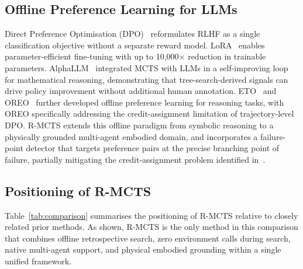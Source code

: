 \documentclass[pdflatex,sn-mathphys-num]{sn-jnl}
\theoremstyle{thmstyleone}
\theoremstyle{thmstyletwo}
\theoremstyle{thmstylethree}
\newcommand{\RMCTS}{\textsc{R-MCTS}}
\begin{document}
\subsection{Offline Preference Learning for LLMs}

Direct Preference Optimisation (DPO)~\cite{rafailov2023direct}
reformulates RLHF as a single classification objective without a
separate reward model.
LoRA~\cite{hu2022lora} enables parameter-efficient fine-tuning with up
to 10,000$\times$ reduction in trainable parameters.
AlphaLLM~\cite{ye2024alphallm} integrated MCTS with LLMs in a
self-improving loop for mathematical reasoning, demonstrating that
tree-search-derived signals can drive policy improvement without
additional human annotation.
ETO~\cite{song2024trial} and OREO~\cite{qu2025oreo} further developed
offline preference learning for reasoning tasks, with OREO specifically
addressing the credit-assignment limitation of trajectory-level DPO.
\RMCTS{} extends this offline paradigm from symbolic reasoning to a
physically grounded multi-agent embodied domain, and incorporates a
failure-point detector that targets preference pairs at the precise
branching point of failure, partially mitigating the credit-assignment
problem identified in~\cite{qu2025oreo}.

\subsection{Positioning of \RMCTS{}}

Table~\ref{tab:comparison} summarises the positioning of \RMCTS{}
relative to closely related prior methods.
As shown, \RMCTS{} is the only method in this comparison that combines
offline retrospective search, zero environment calls during search,
native multi-agent support, and physical embodied grounding within a
single unified framework.
\end{document}
